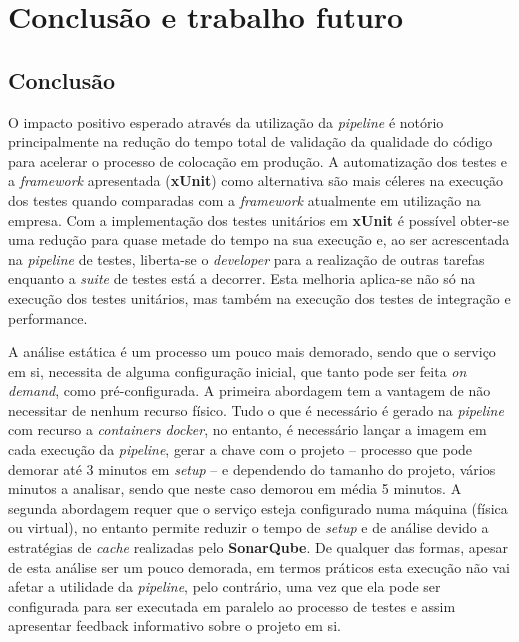 \chapter[Conclusão e trabalho futuro]{Conclusão e trabalho futuro}
\label{Ch:Conclusao}

\section{Conclusão}

 \hspace{1cm}O impacto positivo esperado através da utilização da \textit{pipeline} é notório principalmente na redução do tempo total de validação da qualidade do código para acelerar o processo de colocação em produção. A automatização dos testes e a \textit{framework} apresentada (\textbf{xUnit}) como alternativa são mais céleres na execução dos testes quando comparadas com a \textit{framework} atualmente em utilização na empresa. Com a implementação dos testes unitários em \textbf{xUnit} é possível obter-se uma redução para quase metade do tempo na sua execução e, ao ser acrescentada na \textit{pipeline} de testes, liberta-se o \textit{developer} para a realização de outras tarefas enquanto a \textit{suite} de testes está a decorrer. Esta melhoria aplica-se não só na execução dos testes unitários, mas também na execução dos testes de integração e performance.
 
 \hspace{1cm}A análise estática é um processo um pouco mais demorado, sendo que o serviço em si, necessita de alguma configuração inicial, que tanto pode ser feita \textit{on demand}, como pré-configurada. A primeira abordagem tem a vantagem de não necessitar de nenhum recurso físico. Tudo o que é necessário é gerado na \textit{pipeline} com recurso a \textit{containers docker}, no entanto, é necessário lançar a imagem em cada execução da \textit{pipeline}, gerar a chave com o projeto -- processo que pode demorar até 3 minutos em \textit{setup} -- e dependendo do tamanho do projeto, vários minutos a analisar, sendo que neste caso demorou em média 5 minutos. A segunda abordagem requer que o serviço esteja configurado numa máquina (física ou virtual), no entanto permite reduzir o tempo de \textit{setup} e de análise devido a estratégias de \textit{cache} realizadas pelo \textbf{SonarQube}. De qualquer das formas, apesar de esta análise ser um pouco demorada, em termos práticos esta execução não vai afetar a utilidade da \textit{pipeline}, pelo contrário, uma vez que ela pode ser configurada para ser executada em paralelo ao processo de testes e assim apresentar feedback informativo sobre o projeto em si.
 
